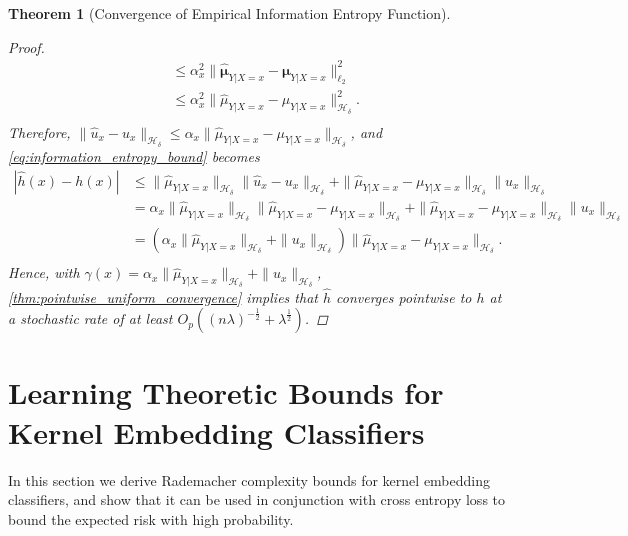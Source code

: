 \documentclass{article}
\newtheorem{theorem}{Theorem}[section]
\begin{document}
\begin{theorem}[Convergence of Empirical Information Entropy Function]
\begin{proof}
\begin{equation}
\begin{aligned}
						&\leq \alpha_{x}^{2} \| \hat{\bm{\mu}}_{Y | X = x} - \bm{\mu}_{Y | X = x}  \|_{\ell_{2}}^{2} \\
						&\leq \alpha_{x}^{2} \| \hat{\mu}_{Y | X = x} - \mu_{Y | X = x} \|_{\mathcal{H}_{\delta}}^{2}. \\
					\end{aligned}
				\end{equation}
				Therefore, $\| \hat{u}_{x} - u_{x} \|_{\mathcal{H}_{\delta}} \leq \alpha_{x} \| \hat{\mu}_{Y | X = x} - \mu_{Y | X = x} \|_{\mathcal{H}_{\delta}}$, and \eqref{eq:information_entropy_bound} becomes
				\begin{equation}
					\begin{aligned}
						| \hat{h}(x) - h(x) | &\leq \| \hat{\mu}_{Y | X = x} \|_{\mathcal{H}_{\delta}} \| \hat{u}_{x} - u_{x} \|_{\mathcal{H}_{\delta}} + \| \hat{\mu}_{Y | X = x} - \mu_{Y | X = x} \|_{\mathcal{H}_{\delta}} \| u_{x} \|_{\mathcal{H}_{\delta}} \\
						&= \alpha_{x} \| \hat{\mu}_{Y | X = x} \|_{\mathcal{H}_{\delta}} \| \hat{\mu}_{Y | X = x} - \mu_{Y | X = x} \|_{\mathcal{H}_{\delta}} + \| \hat{\mu}_{Y | X = x} - \mu_{Y | X = x} \|_{\mathcal{H}_{\delta}} \| u_{x} \|_{\mathcal{H}_{\delta}} \\
						&= ( \alpha_{x} \| \hat{\mu}_{Y | X = x} \|_{\mathcal{H}_{\delta}} + \| u_{x} \|_{\mathcal{H}_{\delta}} ) \| \hat{\mu}_{Y | X = x} - \mu_{Y | X = x} \|_{\mathcal{H}_{\delta}}. \\
					\end{aligned}
				\end{equation}
				Hence, with $\gamma(x) = \alpha_{x} \| \hat{\mu}_{Y | X = x} \|_{\mathcal{H}_{\delta}} + \| u_{x} \|_{\mathcal{H}_{\delta}}$, \cref{thm:pointwise_uniform_convergence} implies that $\hat{h}$ converges pointwise to $h$ at a stochastic rate of at least $O_{p}((n \lambda)^{-\frac{1}{2}} + \lambda^{\frac{1}{2}})$.
			\end{proof}
		\end{theorem}
	
\newpage
\section{Learning Theoretic Bounds for Kernel Embedding Classifiers}
\label{app:learning_theoretic_bounds}

	In this section we derive Rademacher complexity bounds for kernel embedding classifiers, and show that it can be used in conjunction with cross entropy loss to bound the expected risk with high probability.
		
\end{document}
